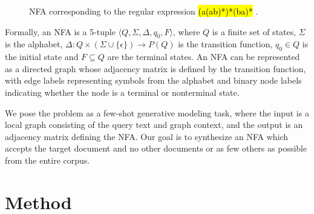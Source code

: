 \documentclass{article}
\newcommand{\tinline}[1]{%
    \begingroup%
    \sethlcolor{slightgray}%
    \hl{\ttfamily\footnotesize #1}%
    \endgroup
}
\begin{document}
\begin{figure}
    \caption{NFA corresponding to the regular expression \tinline{(a(ab)*)*(ba)*}.}
    \label{fig:regex_to_nfa}
\end{figure}

Formally, an NFA is a 5-tuple $\langle Q, \Sigma, \Delta, q_0, F \rangle$, where $Q$ is a finite set of states, $\Sigma$ is the alphabet, $\Delta :Q\times (\Sigma \cup \{\epsilon \})\rightarrow P(Q)$ is the transition function, $q_0 \in Q$ is the initial state and $F \subseteq Q$ are the terminal states. An NFA can be represented as a directed graph whose adjacency matrix is defined by the transition function, with edge labels representing symbols from the alphabet and binary node labels indicating whether the node is a terminal or nonterminal state.

We pose the problem as a few-shot generative modeling task, where the input is a local graph consisting of the query text and graph context, and the output is an adjacency matrix defining the NFA. Our goal is to synthesize an NFA which accepts the target document and no other documents or as few others as possible from the entire corpus.

\section{Method}
\end{document}

